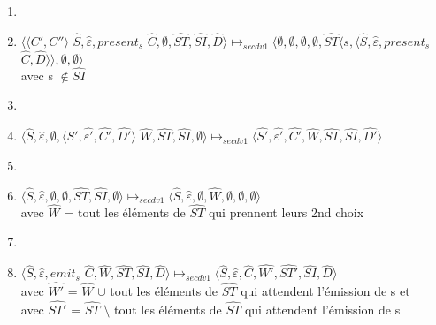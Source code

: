 \documentclass[10pt,a4paper]{article}
\begin{document}
\begin{enumerate}
					\item[]
					\item $\langle\langle C',C''\rangle $ $\widehat{S},\widehat{\varepsilon},present_{s}$ $\widehat{C},\emptyset,\widehat{ST},\widehat{SI},\widehat{D}\rangle \longmapsto_{secdv1} \langle\emptyset,\emptyset,\emptyset,\emptyset,\widehat{ST}\langle s,\langle\widehat{S},\widehat{\varepsilon},present_{s}$ $\widehat{C},\widehat{D}\rangle\rangle,\emptyset,\emptyset\rangle$ 
					\\avec s $\notin \widehat{SI}$ 
					\item[]
					\item $\langle\widehat{S},\widehat{\varepsilon},\emptyset,\langle\widehat{S'},\widehat{\varepsilon'},\widehat{C'},\widehat{D'}\rangle$ $\widehat{W},\widehat{ST},\widehat{SI},\emptyset\rangle \longmapsto_{secdv1} \langle\widehat{S'},\widehat{\varepsilon'},\widehat{C'},\widehat{W},\widehat{ST},\widehat{SI},\widehat{D'}\rangle$
					\item[]
					\item  $\langle\widehat{S},\widehat{\varepsilon},\emptyset,\emptyset,\widehat{ST},\widehat{SI},\emptyset\rangle \longmapsto_{secdv1} \langle\widehat{S},\widehat{\varepsilon},\emptyset,\widehat{W},\emptyset,\emptyset,\emptyset\rangle$ 
					\\avec $\widehat{W}$ = tout les éléments de $\widehat{ST}$ qui prennent leurs 2nd choix 
					\item[]
					\item $\langle\widehat{S},\widehat{\varepsilon},emit_{s}$ $\widehat{C},\widehat{W},\widehat{ST},\widehat{SI},\widehat{D}\rangle \longmapsto_{secdv1} \langle \widehat{S},\widehat{\varepsilon},\widehat{C},\widehat{W'},\widehat{ST'},\widehat{SI},\widehat{D}\rangle$ 
					\\avec $\widehat{W'}$ = $\widehat{W}$ $\cup$ tout les éléments de $\widehat{ST}$ qui attendent l'émission de s et
					\\avec $\widehat{ST'}$ = $\widehat{ST}$ $\setminus$ tout les éléments de $\widehat{ST}$ qui attendent l'émission de s
				\end{enumerate}
				\bigbreak
				\bigbreak
				
\end{document}
